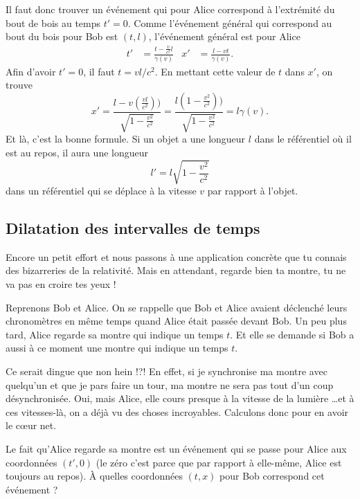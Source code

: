 Il faut donc trouver un événement qui pour Alice correspond à l'extrémité du bout de bois au temps \( t'=0\). Comme l'événement général qui correspond au bout du bois pour Bob est \( (t,l)\), l'événement général est pour Alice
\begin{align}
	t' & =\frac{ t-\frac{ v }{ c^2 }l }{ \gamma(v) }
	   & x'                                          & =\frac{ l-vt }{ \gamma(v) }.
\end{align}
Afin d'avoir \( t'=0\), il faut \( t=vl/c^2\). En mettant cette valeur de \( t\) dans \( x'\), on trouve
\[
	x'=\frac{ l-v\left( \frac{ vl }{ c^2 } \right)) }{ \sqrt{1-\frac{ v^2 }{ c^2 }} }=\frac{ l\left( 1-\frac{ v^2 }{ c^2 } \right)) }{ \sqrt{1-\frac{ v^2 }{ c^2 }} }=l\gamma(v).
\]
Et là, c'est la bonne formule. Si un objet a une longueur \( l\) dans le référentiel où il est au repos, il aura une longueur
\begin{equation}
	l'=l\sqrt{1-\frac{ v^2 }{ c^2 }}
\end{equation}
dans un référentiel qui se déplace à la vitesse \( v\) par rapport à l'objet.


\subsection{Dilatation des intervalles de temps}

Encore un petit effort et nous passons à une application concrète que tu connais des bizarreries de la relativité. Mais en attendant, regarde bien ta montre, tu ne va pas en croire tes yeux !

Reprenons Bob et Alice. On se rappelle que Bob et Alice avaient déclenché leurs chronomètres en même temps quand Alice était passée devant Bob. Un peu plus tard, Alice regarde sa montre qui indique un temps \( t\). Et elle se demande si Bob a aussi à ce moment une montre qui indique un temps \( t\).

Ce serait dingue que non hein !?! En effet, si je synchronise ma montre avec quelqu'un et que je pars faire un tour, ma montre ne sera pas tout d'un coup  désynchronisée. Oui, mais Alice, elle cours presque à la vitesse de la lumière \ldots et à ces vitesses-là, on a déjà vu des choses incroyables. Calculons donc pour en avoir le c\oe ur net.

Le fait qu'Alice regarde sa montre est un événement qui se passe pour Alice aux coordonnées \( (t',0)\) (le zéro c'est parce que par rapport à elle-même, Alice est toujours au repos). À quelles coordonnées \( (t,x)\) pour Bob correspond cet événement ?

